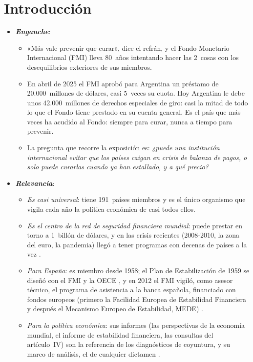 \documentclass[11pt]{article}
\begin{document}
\tceetitulo

\section*{Introducción}

\begin{itemize}
\item \textbf{\emph{Enganche}}:
  \begin{itemize}
  \item «Más vale prevenir que curar», dice el refrán, y el Fondo Monetario Internacional (FMI) lleva 80~años intentando hacer las 2~cosas con los desequilibrios exteriores de sus miembros.
  \item En abril de 2025 el FMI aprobó para Argentina un préstamo de 20.000~millones de dólares, casi 5~veces su cuota. Hoy Argentina le debe unos 42.000~millones de derechos especiales de giro: casi la mitad de todo lo que el Fondo tiene prestado en su cuenta general\nocite{FMI2025ArgentinaEFF,FMI2026FA}. Es el país que más veces ha acudido al Fondo: siempre para curar, nunca a tiempo para prevenir.
  \item La pregunta que recorre la exposición es: \emph{¿puede una institución internacional evitar que los países caigan en crisis de balanza de pagos, o solo puede curarlas cuando ya han estallado, y a qué precio?}
  \end{itemize}

\item \textbf{\emph{Relevancia}}:
  \begin{itemize}
  \item \emph{Es casi universal}: tiene 191~países miembros y es el único organismo que vigila cada año la política económica de casi todos ellos.
  \item \emph{Es el centro de la red de seguridad financiera mundial}: puede prestar en torno a 1~billón de dólares\nocite{FMI2026InformeAnual}, y en las crisis recientes (2008-2010, la zona del euro, la pandemia) llegó a tener programas con decenas de países a la vez .
  \item \emph{Para España}: es miembro desde 1958; el Plan de Estabilización de 1959 se diseñó con el FMI y la OECE , y en 2012 el FMI vigiló, como asesor técnico, el programa de asistencia a la banca española, financiado con fondos europeos (primero la Facilidad Europea de Estabilidad Financiera y después el Mecanismo Europeo de Estabilidad, MEDE)  .
  \item \emph{Para la política económica}: sus informes (las perspectivas de la economía mundial, el informe de estabilidad financiera, las consultas del artículo~IV) son la referencia de los diagnósticos de coyuntura, y su marco de análisis, el de cualquier dictamen .
  \end{itemize}


\end{itemize}
\end{document}
